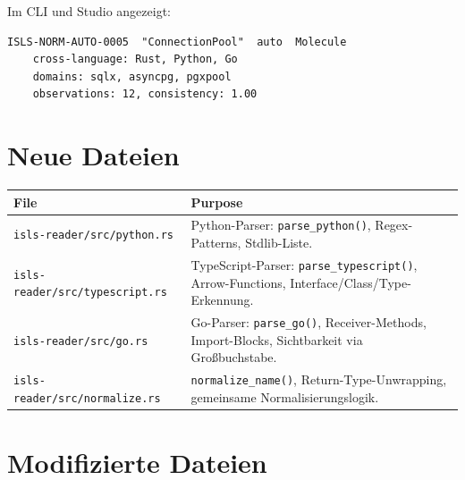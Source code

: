\documentclass[11pt,a4paper]{article}
\begin{document}
Im CLI und Studio angezeigt:

\begin{lstlisting}[style=bash]
ISLS-NORM-AUTO-0005  "ConnectionPool"  auto  Molecule
    cross-language: Rust, Python, Go
    domains: sqlx, asyncpg, pgxpool
    observations: 12, consistency: 1.00
\end{lstlisting}


\section{Neue Dateien}

\begin{longtable}{lp{10cm}}
\toprule
\textbf{File} & \textbf{Purpose} \\
\midrule
\texttt{isls-reader/src/python.rs}
  & Python-Parser: \texttt{parse\_python()}, Regex-Patterns, 
    Stdlib-Liste. \\
\texttt{isls-reader/src/typescript.rs}
  & TypeScript-Parser: \texttt{parse\_typescript()}, 
    Arrow-Functions, Interface/Class/Type-Erkennung. \\
\texttt{isls-reader/src/go.rs}
  & Go-Parser: \texttt{parse\_go()}, Receiver-Methods, 
    Import-Blocks, Sichtbarkeit via Gro{\ss}buchstabe. \\
\texttt{isls-reader/src/normalize.rs}
  & \texttt{normalize\_name()}, Return-Type-Unwrapping, 
    gemeinsame Normalisierungslogik. \\
\bottomrule
\end{longtable}


\section{Modifizierte Dateien}
\end{document}
